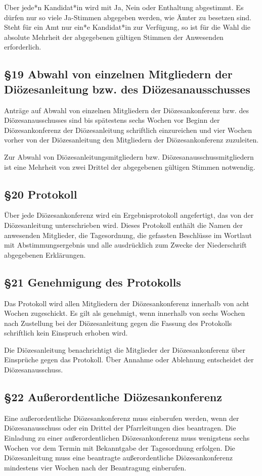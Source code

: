 \documentclass[12pt]{report}
\begin{document}
\begin{flushleft}
Über jede*n Kandidat*in wird mit Ja, Nein oder Enthaltung abgestimmt. Es dürfen nur so viele Ja-Stimmen
abgegeben werden, wie Ämter zu besetzen sind. Steht für ein Amt nur ein*e Kandidat*in zur Verfügung, so ist für
die Wahl die absolute Mehrheit der abgegebenen gültigen Stimmen der Anwesenden erforderlich.

\subsection*{§19 Abwahl von einzelnen Mitgliedern der Diözesanleitung bzw. des Diözesanausschusses}
Anträge auf Abwahl von einzelnen Mitgliedern der Diözesankonferenz bzw. des Diözesanausschusses sind
bis spätestens sechs Wochen vor Beginn der Diözesankonferenz der Diözesanleitung schriftlich einzureichen
und vier Wochen vorher von der Diözesanleitung den Mitgliedern der Diözesankonferenz zuzuleiten.

Zur Abwahl von Diözesanleitungsmitgliedern bzw. Diözesanausschussmitgliedern ist eine Mehrheit von zwei
Drittel der abgegebenen gültigen Stimmen notwendig.

\subsection*{§20 Protokoll}
Über jede Diözesankonferenz wird ein Ergebnisprotokoll angefertigt, das von der Diözesanleitung 
unterschrieben wird. Dieses Protokoll enthält die Namen der anwesenden Mitglieder, die Tagesordnung,
die gefassten Beschlüsse im Wortlaut mit Abstimmungsergebnis und alle ausdrücklich zum Zwecke der 
Niederschrift abgegebenen Erklärungen.
\subsection*{§21 Genehmigung des Protokolls}
Das Protokoll wird allen Mitgliedern der Diözesankonferenz innerhalb von acht Wochen zugeschickt. Es gilt
als genehmigt, wenn innerhalb von sechs Wochen nach Zustellung bei der Diözesanleitung gegen die Fassung
des Protokolls schriftlich kein Einspruch erhoben wird.

Die Diözesanleitung benachrichtigt die Mitglieder der Diözesankonferenz über Einsprüche gegen das Protokoll.
Über Annahme oder Ablehnung entscheidet der Diözesanausschuss.
\subsection*{§22 Außerordentliche Diözesankonferenz}
Eine außerordentliche Diözesankonferenz muss einberufen werden, wenn der Diözesanausschuss oder ein
Drittel der Pfarrleitungen dies beantragen. Die Einladung zu einer außerordentlichen Diözesankonferenz
muss wenigstens sechs Wochen vor dem Termin mit Bekanntgabe der Tagesordnung erfolgen.
Die Diözesanleitung muss eine beantragte außerordentliche Diözesankonferenz mindestens vier Wochen
nach der Beantragung einberufen.

\end{flushleft}
\end{document}
